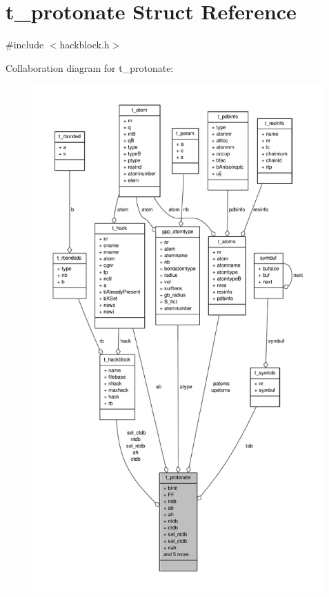 \hypertarget{structt__protonate}{\section{t\-\_\-protonate \-Struct \-Reference}
\label{structt__protonate}
}


{\ttfamily \#include $<$hackblock.\-h$>$}



\-Collaboration diagram for t\-\_\-protonate\-:
\nopagebreak
\begin{figure}[H]
\begin{center}
\leavevmode
\includegraphics[height=550pt]{structt__protonate__coll__graph}
\end{center}
\end{figure}
